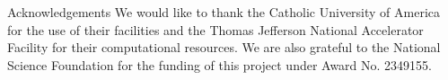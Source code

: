 \documentclass[final]{beamer}
\newlength{\sepwidth}
\newlength{\colwidth}
\newcommand{\separatorcolumn}{\begin{column}{\sepwidth}\end{column}}
\begin{document}
\begin{frame}[t]
\begin{columns}[t]
\begin{column}{\colwidth}
\vspace{-1.25cm}
  \begin{block}{Acknowledgements}
\small We would like to thank the Catholic University of America for the use of their facilities and the Thomas Jefferson National Accelerator Facility for their computational resources. We are also grateful to the National Science Foundation for the funding of this project under Award No. 2349155. 

  \end{block}

\end{column}
\separatorcolumn
\end{columns}
\end{frame}
\end{document}
